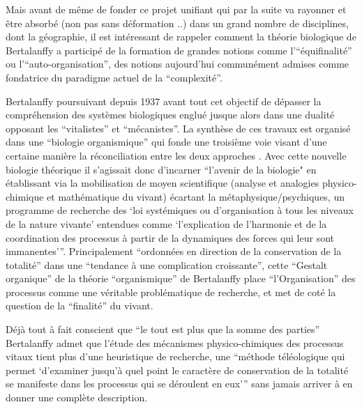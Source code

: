 Mais avant de même de fonder ce projet unifiant qui par la suite va rayonner et être absorbé (non pas sans déformation ..) dans un grand nombre de disciplines, dont la géographie, il est intéressant de rappeler comment la théorie biologique de Bertalanffy a participé de la formation de grandes notions comme l'\enquote{équifinalité} ou l'\enquote{auto-organisation}, des notions aujourd'hui communément admises comme fondatrice du paradigme actuel de la \enquote{complexité}.

Bertalanffy poursuivant depuis 1937 avant tout cet objectif de dépasser la compréhension des systèmes biologiques  englué jusque alors dans une dualité opposant les \enquote{vitalistes} et \enquote{mécanistes}. La synthèse de ces travaux est organisé dans une \enquote{biologie organismique} qui fonde une troisième voie visant d'une certaine manière la réconciliation entre les deux approches \autocite[55-56]{Lemoigne1977} \autocite[258]{Bertalanffy1949}. Avec cette nouvelle biologie théorique il s'agissait donc d'incarner \enquote{l'avenir de la biologie" en établissant via la mobilisation de moyen scientifique (analyse et analogies physico-chimique et mathématique du vivant) écartant la métaphysique/psychiques, un programme de recherche des \enquote{loi systémiques ou d'organisation à tous les niveaux de la nature vivante} entendues comme \enquote{l'explication de l'harmonie et de la coordination des processus à partir de la dynamiques des forces qui leur sont immanentes}}\autocite[456]{Pouvreau2013}. Principalement \enquote{ordonnées en direction de la conservation de la totalité}\autocite[440-458]{Pouvreau2013} dans une \enquote{tendance à une complication croissante}, cette \enquote{Gestalt organique} de la théorie \enquote{organismique} de Bertalanffy place \enquote{l'Organisation} des processus comme une véritable problématique de recherche, et met de coté la question de la \enquote{finalité} du vivant.\autocite[455-457]{Pouvreau2013}

Déjà tout à fait conscient que \enquote{le tout est plus que la somme des parties} Bertalanffy admet que l'étude des mécanismes physico-chimiques des processus vitaux tient plus d'une heuristique de recherche, une \enquote{méthode téléologique qui permet \enquote{d'examiner jusqu’à quel point le caractère de conservation de la totalité se manifeste dans les processus qui se déroulent en eux}} sans jamais arriver à en donner une complète description.\autocite[464]{Pouvreau2013}

